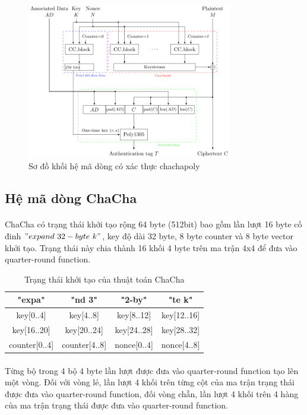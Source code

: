 \begin{figure}[H]
	\centering
	\includegraphics[width=0.8\textwidth]{images/ChaCha20-Poly1305_Encryption.png}
	\caption{Sơ đồ khối hệ mã dòng có xác thực \Gls{chachapoly}}
\end{figure}

\subsection{Hệ mã dòng ChaCha}

\paragraph{}
ChaCha có trạng thái khởi tạo rộng 64 byte (512bit) bao gồm lần lượt 16 byte cố đinh $"expand\ 32-byte\ k"$, \gls{key} độ dài 32 byte, 8 byte counter và 8 byte vector khởi tạo. Trạng thái này chia thành 16 khối 4 byte trên ma trận 4x4 để đưa vào \gls{quarter}-\gls{round function}.

\begin{table}[h]
	\caption{Trạng thái khởi tạo của thuật toán ChaCha}
	\centering
	\begin{tabular}{|c|c|c|c|}
		\hline
		"expa" & "nd 3" & "2-by" & "te k"\\
		\hline
		key[0..4] &key[4..8] &key[8..12] &key[12..16] \\
		\hline
		key[16..20] &key[20..24] &key[24..28] &key[28..32] \\
		\hline
		counter[0..4] & counter[4..8] & nonce[0..4] & nonce[4..8]\\
		\hline
	\end{tabular}

\end{table}

\paragraph{}
Từng bộ trong 4 bộ 4 byte lần lượt được đưa vào \gls{quarter}-\gls{round function} tạo lên một vòng. Đối với vòng lẻ, lần lượt 4 khối trên từng cột của ma trận trạng thái được đưa vào \gls{quarter}-\gls{round function}, đối vòng chẵn, lần lượt 4 khối trên 4 hàng của ma trận trạng thái được đưa vào \gls{quarter}-\gls{round function}.

